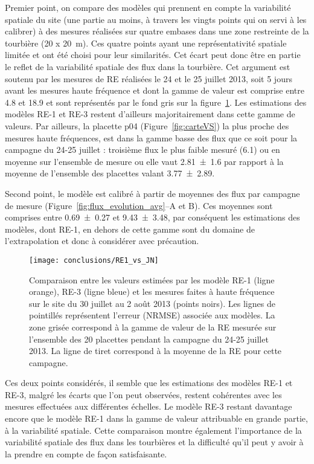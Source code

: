 Premier point, on compare des modèles qui prennent en compte la variabilité spatiale du site (une partie au moins, à travers les vingts points qui on servi à les calibrer) à des mesures réalisées sur quatre embases dans une zone restreinte de la tourbière (20 x \SI{20}{\metre}).
Ces quatre points ayant une représentativité spatiale limitée et ont été choisi pour leur similarités.
Cet écart peut donc être en partie le reflet de la variabilité spatiale des flux dans la tourbière.
Cet argument est soutenu par les mesures de RE réalisées le 24 et le 25 juillet 2013, soit 5 jours avant les mesures haute fréquence et dont la gamme de valeur est comprise entre \num{4.8} et \SI{18.9}{\uml} et sont représentés par le fond gris sur la figure~\ref{fig:RE1_vs_JN}.
Les estimations des modèles RE-1 et RE-3 restent d'ailleurs majoritairement dans cette gamme de valeurs.
Par ailleurs, la placette p04 (Figure~\ref{fig:carteVS}) la plus proche des mesures haute fréquences, est dans la gamme basse des flux que ce soit pour la campagne du 24-25 juillet : troisième flux le plus faible mesuré (\SI{6.1}{\uml}) ou en moyenne sur l'ensemble de mesure ou elle vaut \SI{2.81(160)}{\uml} par rapport à la moyenne de l'ensemble des placettes valant \SI{3.77(289)}{\uml}.

Second point, le modèle est calibré à partir de moyennes des flux par campagne de mesure (Figure~\ref{fig:flux_evolution_avg}--A et B).
Ces moyennes sont comprises entre \num{0.69(027)} et \SI{9.43(348)}{\uml}, par conséquent les estimations des modèles, dont RE-1, en dehors de cette gamme sont du domaine de l'extrapolation et donc à considérer avec précaution.

\begin{figure}
\centering
\texttt{[image: conclusions/RE1\_vs\_JN]}
\caption{Comparaison entre les valeurs estimées par les modèle RE-1 (ligne orange), RE-3 (ligne bleue) et les mesures faites à haute fréquence sur le site du 30 juillet au 2 août 2013 (points noirs). Les lignes de pointillés représentent l'erreur (NRMSE) associée aux modèles. La zone grisée correspond à la gamme de valeur de la RE mesurée sur l'ensemble des 20 placettes pendant la campagne du 24-25 juillet 2013. La ligne de tiret correspond à la moyenne de la RE pour cette campagne.}
\label{fig:RE1_vs_JN}
\end{figure}

Ces deux points considérés, il semble que les estimations des modèles RE-1 et RE-3, malgré les écarts que l'on peut observées, restent cohérentes avec les mesures effectuées aux différentes échelles.
Le modèle RE-3 restant davantage encore que le modèle RE-1 dans la gamme de valeur attribuable en grande partie, à la variabilité spatiale.
Cette comparaison montre également l'importance de la variabilité spatiale des flux dans les tourbières et la difficulté qu'il peut y avoir à la prendre en compte de façon satisfaisante.



